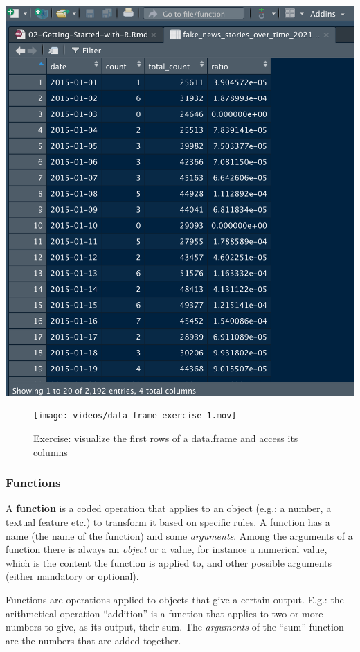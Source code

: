 \documentclass[
]{article}
\begin{document}
\includegraphics[width=14.04in]{images/data-frame-example}

\begin{figure}
\centering
\texttt{[image: videos/data-frame-exercise-1.mov]}
\caption{Exercise: visualize the first rows of a data.frame and access its columns}
\end{figure}

\hypertarget{functions}{%
\subsubsection{Functions}\label{functions}}

A \textbf{function} is a coded operation that applies to an object (e.g.: a number, a textual feature etc.) to transform it based on specific rules. A function has a name (the name of the function) and some \emph{arguments}. Among the arguments of a function there is always an \emph{object} or a value, for instance a numerical value, which is the content the function is applied to, and other possible arguments (either mandatory or optional).

Functions are operations applied to objects that give a certain output. E.g.: the arithmetical operation ``addition'' is a function that applies to two or more numbers to give, as its output, their sum. The \emph{arguments} of the ``sum'' function are the numbers that are added together.
\end{document}
